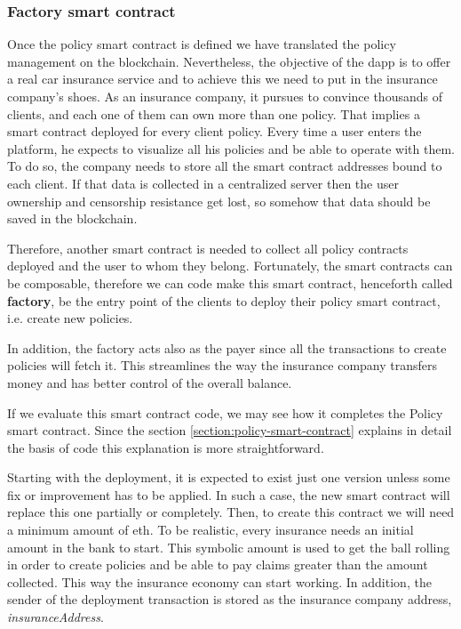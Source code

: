 \subsubsection{Factory smart contract}
\label{section:factory-sc}
{
Once the policy smart contract is defined we have translated the policy management on the blockchain. Nevertheless, the objective of the dapp is to offer a real car insurance service and to achieve this we need to put in the insurance company's shoes. As an insurance company, it pursues to convince thousands of clients, and each one of them can own more than one policy. That implies a smart contract deployed for every client policy. Every time a user enters the platform, he expects to visualize all his policies and be able to operate with them. To do so, the company needs to store all the smart contract addresses bound to each client. If that data is collected in a centralized server then the user ownership and censorship resistance get lost, so somehow that data should be saved in the blockchain. 

Therefore, another smart contract is needed to collect all policy contracts deployed and the user to whom they belong. Fortunately, the smart contracts can be composable, therefore we can code make this smart contract, henceforth called \textbf{factory}, be the entry point of the clients to deploy their policy smart contract, i.e. create new policies.

In addition, the factory acts also as the payer since all the transactions to create policies will fetch it. This streamlines the way the insurance company transfers money and has better control of the overall balance. 


If we evaluate this smart contract code, we may see how it completes the Policy smart contract. Since the section \ref{section:policy-smart-contract} explains in detail the basis of code this explanation is more straightforward. 

Starting with the deployment, it is expected to exist just one version unless some fix or improvement has to be applied. In such a case, the new smart contract will replace this one partially or completely. Then, to create this contract we will need a minimum amount of \acrshort{eth}. To be realistic, every insurance needs an initial amount in the bank to start. This symbolic amount is used to get the ball rolling in order to create policies and be able to pay claims greater than the amount collected. This way the insurance economy can start working. In addition, the sender of the deployment transaction is stored as the insurance company address, \textit{insuranceAddress}.

}
